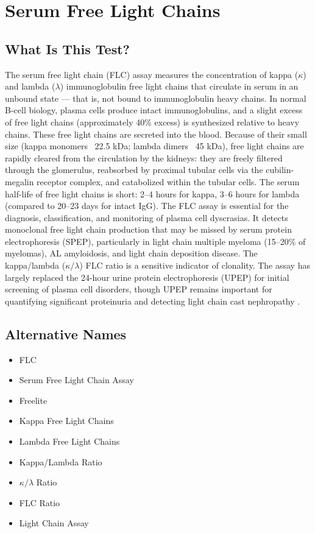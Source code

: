 \chapter{Serum Free Light Chains}

\section*{What Is This Test?}
The serum free light chain (FLC) assay measures the concentration of kappa ($\kappa$) and lambda ($\lambda$) immunoglobulin free light chains that circulate in serum in an unbound state --- that is, not bound to immunoglobulin heavy chains. In normal B-cell biology, plasma cells produce intact immunoglobulins, and a slight excess of free light chains (approximately 40\% excess) is synthesized relative to heavy chains. These free light chains are secreted into the blood. Because of their small size (kappa monomers ~22.5 kDa; lambda dimers ~45 kDa), free light chains are rapidly cleared from the circulation by the kidneys: they are freely filtered through the glomerulus, reabsorbed by proximal tubular cells via the cubilin-megalin receptor complex, and catabolized within the tubular cells. The serum half-life of free light chains is short: 2--4 hours for kappa, 3--6 hours for lambda (compared to 20--23 days for intact IgG). The FLC assay is essential for the diagnosis, classification, and monitoring of plasma cell dyscrasias. It detects monoclonal free light chain production that may be missed by serum protein electrophoresis (SPEP), particularly in light chain multiple myeloma (15--20\% of myelomas), AL amyloidosis, and light chain deposition disease. The kappa/lambda ($\kappa/\lambda$) FLC ratio is a sensitive indicator of clonality. The assay has largely replaced the 24-hour urine protein electrophoresis (UPEP) for initial screening of plasma cell disorders, though UPEP remains important for quantifying significant proteinuria and detecting light chain cast nephropathy \cite{katzmann2006elimination}.

\section*{Alternative Names}
\begin{itemize}
  \item FLC
  \item Serum Free Light Chain Assay
  \item Freelite
  \item Kappa Free Light Chains
  \item Lambda Free Light Chains
  \item Kappa/Lambda Ratio
  \item $\kappa/\lambda$ Ratio
  \item FLC Ratio
  \item Light Chain Assay
\end{itemize}
